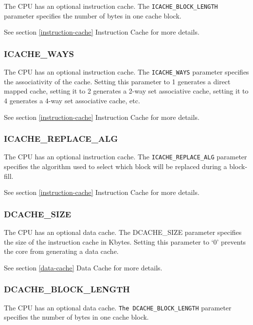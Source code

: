 The CPU has an optional instruction cache. The \texttt{ICACHE\_BLOCK\_LENGTH}
parameter specifies the number of bytes in one cache block.

See section \ref{instruction-cache} Instruction Cache for more details.

\subsubsection{ICACHE\_WAYS}\label{icache_ways}

The CPU has an optional instruction cache. The \texttt{ICACHE\_WAYS} parameter
specifies the associativity of the cache. Setting this parameter to 1
generates a direct mapped cache, setting it to 2 generates a 2-way set
associative cache, setting it to 4 generates a 4-way set associative
cache, etc.

See section \ref{instruction-cache} Instruction Cache for more details.

\subsubsection{ICACHE\_REPLACE\_ALG}\label{icache_replace_alg}

The CPU has an optional instruction cache. The \texttt{ICACHE\_REPLACE\_ALG}
parameter specifies the algorithm used to select which block will be
replaced during a block-fill.

See section \ref{instruction-cache} Instruction Cache for more details.

\subsubsection{DCACHE\_SIZE}\label{dcache_size}

The CPU has an optional data cache. The DCACHE\_SIZE parameter specifies
the size of the instruction cache in Kbytes. Setting this parameter to
`0' prevents the core from generating a data cache.

See section \ref{data-cache} Data Cache for more details.

\subsubsection{DCACHE\_BLOCK\_LENGTH}\label{dcache_block_length}

The CPU has an optional data cache. \texttt{The DCACHE\_BLOCK\_LENGTH} parameter
specifies the number of bytes in one cache block.

